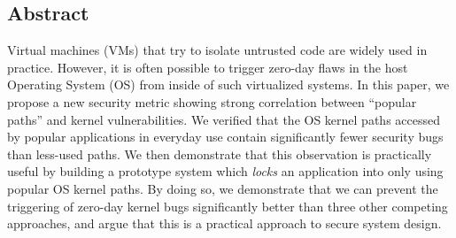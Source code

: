 \subsection*{Abstract}

%
%

%
%

Virtual machines (VMs) that try to isolate untrusted code are widely used in practice. 
However, it is often possible to trigger zero-day flaws
in the host Operating System (OS) from inside of such virtualized systems.
%
In this paper, we propose a new security metric showing strong correlation between ``popular paths'' 
and kernel vulnerabilities. We verified that the OS kernel paths accessed 
by popular applications in everyday use contain significantly fewer security bugs than less-used paths.  We then demonstrate that this observation is
practically useful by building a prototype system which \textit{locks} an
application into only using popular OS kernel paths.  By doing so, we
demonstrate that
we can prevent the triggering of zero-day kernel bugs
significantly better than three other competing approaches, and argue that
this is a practical approach to  secure system design.
